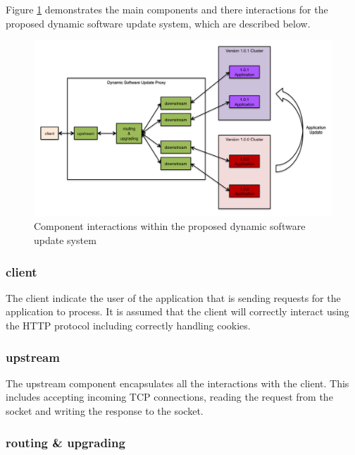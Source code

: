\documentclass[a4paper,11pt,twoside]{report}
\begin{document}
Figure \ref{proposed_solution} demonstrates the main components and there interactions for the proposed dynamic software update system, which are described below.

\begin{figure}[!ht]
  \centering
     \includegraphics[scale=0.31]{proposed_solution}
  \caption{Component interactions within the proposed  dynamic software update system}
  \label{proposed_solution}
\end{figure}

\subsubsection*{client}

\noindent
The client indicate the user of the application that is sending requests for the application to process.  It is assumed that the client will correctly interact using the HTTP protocol including correctly handling cookies.

\subsubsection*{upstream}

\noindent
The upstream component encapsulates all the interactions with the client.  This includes accepting incoming TCP connections, reading the request from the socket and writing the response to the socket.

\subsubsection*{routing \& upgrading}
\end{document}
